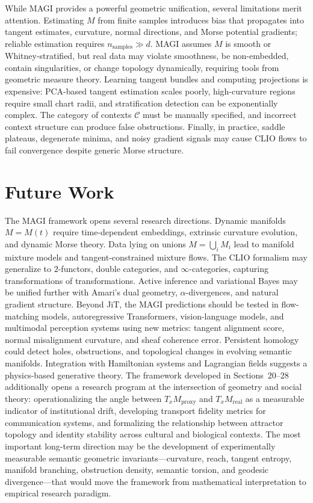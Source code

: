 \documentclass[11pt,a4paper,twocolumn]{article}
\begin{document}
While MAGI provides a powerful geometric unification, several
limitations merit attention. Estimating $M$ from finite samples
introduces bias that propagates into tangent estimates, curvature,
normal directions, and Morse potential gradients; reliable estimation
requires $n_{\mathrm{samples}} \gg d$. MAGI assumes $M$ is smooth or
Whitney-stratified, but real data may violate smoothness, be
non-embedded, contain singularities, or change topology dynamically,
requiring tools from geometric measure theory. Learning tangent bundles
and computing projections is expensive: PCA-based tangent estimation
scales poorly, high-curvature regions require small chart radii, and
stratification detection can be exponentially complex. The category of
contexts $\mathcal{C}$ must be manually specified, and incorrect context
structure can produce false obstructions. Finally, in practice, saddle
plateaus, degenerate minima, and noisy gradient signals may cause CLIO
flows to fail convergence despite generic Morse structure.


\section{Future Work}

The MAGI framework opens several research directions. Dynamic manifolds
$M = M(t)$ require time-dependent embeddings, extrinsic curvature
evolution, and dynamic Morse theory. Data lying on unions
$M = \bigcup_i M_i$ lead to manifold mixture models and
tangent-constrained mixture flows. The CLIO formalism may generalize to
$2$-functors, double categories, and $\infty$-categories, capturing
transformations of transformations. Active inference and variational
Bayes may be unified further with Amari's dual geometry,
$\alpha$-divergences, and natural gradient structure. Beyond JiT, the
MAGI predictions should be tested in flow-matching models,
autoregressive Transformers, vision-language models, and multimodal
perception systems using new metrics: tangent alignment score, normal
misalignment curvature, and sheaf coherence error. Persistent homology
could detect holes, obstructions, and topological changes in evolving
semantic manifolds. Integration with Hamiltonian systems and Lagrangian
fields suggests a physics-based generative theory. The framework
developed in Sections~20--28 additionally opens a research program at
the intersection of geometry and social theory: operationalizing the
angle between $T_x M_{\mathrm{proxy}}$ and $T_x M_{\mathrm{real}}$ as
a measurable indicator of institutional drift, developing transport
fidelity metrics for communication systems, and formalizing the
relationship between attractor topology and identity stability across
cultural and biological contexts. The most important long-term
direction may be the development of experimentally measurable semantic
geometric invariants---curvature, reach, tangent entropy, manifold
branching, obstruction density, semantic torsion, and geodesic
divergence---that would move the framework from mathematical
interpretation to empirical research paradigm.
\end{document}
